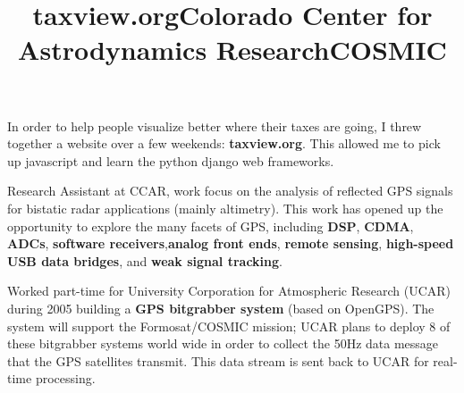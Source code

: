 \begin{resume}
\begin{position}
\end{position}

\title{{\bf taxview.org}}
\begin{position}
In order to help people visualize better where their taxes are going, I threw together a website over a few weekends: {\bf taxview.org}. This allowed me to pick up javascript and learn the python django web frameworks.
\end{position}

\title{\bf Colorado Center for Astrodynamics Research}
\begin{position}
Research Assistant at CCAR, work focus on the analysis of reflected GPS signals for bistatic radar applications (mainly altimetry). This work has opened up the opportunity to explore the many facets of GPS, including {\bf DSP}, {\bf CDMA}, {\bf ADCs}, {\bf software receivers},{\bf  analog front ends}, {\bf remote sensing}, {\bf high-speed USB data bridges}, and {\bf weak signal tracking}. 

\end{position}


\title{\bf COSMIC}
\begin{position}
Worked part-time for University Corporation for Atmospheric Research (UCAR) during 2005 building a {\bf GPS bitgrabber system} (based on OpenGPS). The system will support the Formosat/COSMIC mission; UCAR plans to deploy 8 of these bitgrabber systems world wide in order to collect the 50Hz data message that the GPS satellites transmit. This data stream is sent back to UCAR for real-time processing. 
\end{position}


\end{resume}
